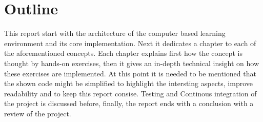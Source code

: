 \section{Outline}

This report start with the architecture of the computer based learning environment and its core implementation. Next it dedicates a chapter to each of the aforementioned concepts. Each chapter explains first how the concept is thought by hands-on exercises, then it gives an in-depth technical insight on how these exercises are implemented. At this point it is needed to be mentioned that the shown code might be simplified to highlight the intersting aspects, improve readability and to keep this report consise. Testing and Continous integration of the project is discussed before, finally, the report ends with a conclusion with a review of the project. 
